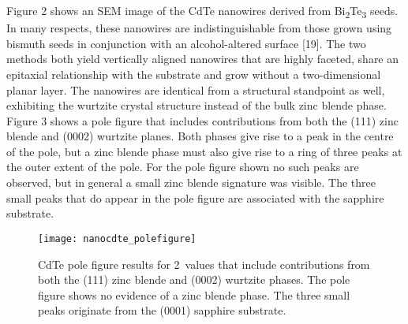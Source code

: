 Figure 2 shows an SEM image of the CdTe nanowires
derived from Bi\textsubscript{2}Te\textsubscript{3} seeds. In many respects, these nanowires
are indistinguishable from those grown using bismuth seeds
in conjunction with an alcohol-altered surface [19]. The two
methods both yield vertically aligned nanowires that are highly
faceted, share an epitaxial relationship with the substrate and
grow without a two-dimensional planar layer. The nanowires
are identical from a structural standpoint as well, exhibiting
the wurtzite crystal structure instead of the bulk zinc blende phase. Figure 3
shows a pole figure that includes contributions from both
the (111) zinc blende and (0002) wurtzite planes. Both phases give rise to a peak in the
centre of the pole, but a zinc blende phase must also give rise to
a ring of three peaks at the outer extent of the pole. For the pole
figure shown no such peaks are observed, but in general a small
zinc blende signature was visible. The three small peaks that
do appear in the pole figure are associated with the sapphire
substrate.
\begin{figure}
    \centering
    \texttt{[image: nanocdte\_polefigure]}
    \caption{\label{fig:nanocdte_polefigure}CdTe pole figure results for 2\straighttheta~values that include contributions from both the (111) zinc blende and (0002) wurtzite phases. The pole figure shows no evidence of a zinc blende phase. The three small peaks originate from the (0001) sapphire substrate.}
\end{figure}

